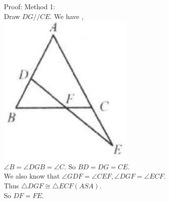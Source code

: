 \documentclass[10pt]{article}
\begin{document}
Proof:
Method 1:\\
Draw \(D G / / C E\). We have ,\\
\includegraphics[max width=\textwidth, center]{2025_04_17_97bc1f7e44d93c271a88g-102}\\
\(\angle B=\angle D G B=\angle C\). So \(B D=D G=C E\).\\
We also know that \(\angle G D F=\angle C E F, \angle D G F=\angle E C F\).\\
Thus \(\triangle D G F \cong \triangle E C F(A S A)\).\\
So \(D F=F E\).\\
\end{document}
